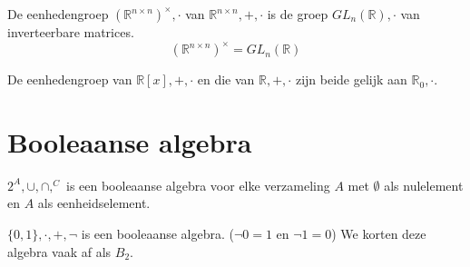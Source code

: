 \documentclass[main.tex]{subfiles}
\begin{document}
\begin{vb}
  De eenhedengroep $(\mathbb{R}^{n\times n})^{\times},\cdot$ van $\mathbb{R}^{n\times n},+,\cdot$ is de groep $GL_{n}(\mathbb{R}),\cdot$ van inverteerbare matrices.
  \[ (\mathbb{R}^{n\times n})^{\times} = GL_{n}(\mathbb{R}) \]
\end{vb}

\begin{vb}
  De eenhedengroep van $\mathbb{R}[x],+,\cdot$ en die van $\mathbb{R},+,\cdot$ zijn beide gelijk aan  $\mathbb{R}_{0},\cdot$.
\end{vb}

 


\section{Booleaanse algebra}
\label{sec:booleaanse-algebra}

\begin{vb}
  $2^{A},\cup,\cap,^{C}$ is een booleaanse algebra voor elke verzameling $A$ met $\emptyset$ als nulelement en $A$ als eenheidselement.
\end{vb}

\begin{vb}
  $\{0,1\},\cdot,+,\neg$ is een booleaanse algebra. ($\neg 0 = 1$ en $\neg 1 = 0$)
  We korten deze algebra vaak af als $B_{2}$.
\end{vb}
\end{document}
